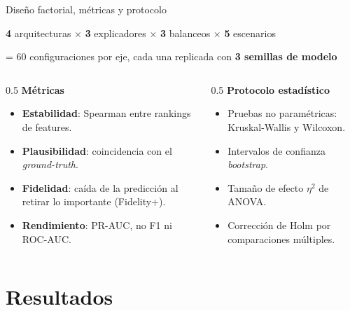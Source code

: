 \documentclass[aspectratio=169,11pt]{beamer}
\begin{document}
\begin{frame}{Diseño factorial, métricas y protocolo}
\begin{center}
{\color{teal}\Large\textbf{4}} arquitecturas \; $\times$ \; {\color{amber}\Large\textbf{3}} explicadores \; $\times$ \; {\color{seafoam}\Large\textbf{3}} balanceos \; $\times$ \; {\color{coral}\Large\textbf{5}} escenarios
\end{center}
\vspace{0.2em}
\begin{center}\small = 60 configuraciones por eje, cada una replicada con \textbf{3 semillas de modelo}\end{center}
\vspace{0.4em}
\begin{columns}[T]
\begin{column}{0.5\textwidth}
{\footnotesize\color{navy}\textbf{Métricas}}
\begin{itemize}\scriptsize
  \item \textbf{Estabilidad}: Spearman entre rankings de features.
  \item \textbf{Plausibilidad}: coincidencia con el \emph{ground-truth}.
  \item \textbf{Fidelidad}: caída de la predicción al retirar lo importante (Fidelity+).
  \item \textbf{Rendimiento}: PR-AUC, no F1 ni ROC-AUC.
\end{itemize}
\end{column}
\begin{column}{0.5\textwidth}
{\footnotesize\color{navy}\textbf{Protocolo estadístico}}
\begin{itemize}\scriptsize
  \item Pruebas no paramétricas: Kruskal-Wallis y Wilcoxon.
  \item Intervalos de confianza \emph{bootstrap}.
  \item Tamaño de efecto $\eta^2$ de ANOVA.
  \item Corrección de Holm por comparaciones múltiples.
\end{itemize}
\end{column}
\end{columns}
\end{frame}

\section{Resultados}
\end{document}
